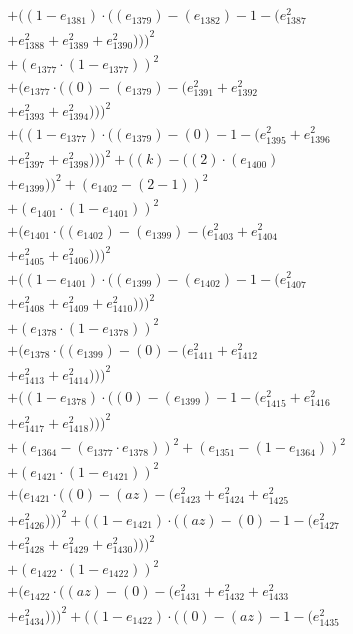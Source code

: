 \documentclass[10pt, a4paper]{article}
\begin{document}
\begin{small}
\begin{align*}
& + ((1 - e_{1381})  \cdot  ((e_{1379}) - (e_{1382}) - 1 - (e_{1387}^{2} \\
& + e_{1388}^{2} + e_{1389}^{2} + e_{1390}^{2})))^{2} \\
& + (e_{1377}  \cdot  (1 - e_{1377}))^{2} \\
& + (e_{1377}  \cdot  ((0) - (e_{1379}) - (e_{1391}^{2} + e_{1392}^{2} \\
& + e_{1393}^{2} + e_{1394}^{2})))^{2} \\
& + ((1 - e_{1377})  \cdot  ((e_{1379}) - (0) - 1 - (e_{1395}^{2} + e_{1396}^{2} \\
& + e_{1397}^{2} + e_{1398}^{2})))^{2} + ((k) - ((2)  \cdot  (e_{1400}) \\
& + e_{1399}))^{2} + (e_{1402} - (2 - 1))^{2} \\
& + (e_{1401}  \cdot  (1 - e_{1401}))^{2} \\
& + (e_{1401}  \cdot  ((e_{1402}) - (e_{1399}) - (e_{1403}^{2} + e_{1404}^{2} \\
& + e_{1405}^{2} + e_{1406}^{2})))^{2} \\
& + ((1 - e_{1401})  \cdot  ((e_{1399}) - (e_{1402}) - 1 - (e_{1407}^{2} \\
& + e_{1408}^{2} + e_{1409}^{2} + e_{1410}^{2})))^{2} \\
& + (e_{1378}  \cdot  (1 - e_{1378}))^{2} \\
& + (e_{1378}  \cdot  ((e_{1399}) - (0) - (e_{1411}^{2} + e_{1412}^{2} \\
& + e_{1413}^{2} + e_{1414}^{2})))^{2} \\
& + ((1 - e_{1378})  \cdot  ((0) - (e_{1399}) - 1 - (e_{1415}^{2} + e_{1416}^{2} \\
& + e_{1417}^{2} + e_{1418}^{2})))^{2} \\
& + (e_{1364} - (e_{1377}  \cdot  e_{1378}))^{2} + (e_{1351} - (1 - e_{1364}))^{2} \\
& + (e_{1421}  \cdot  (1 - e_{1421}))^{2} \\
& + (e_{1421}  \cdot  ((0) - (az) - (e_{1423}^{2} + e_{1424}^{2} + e_{1425}^{2} \\
& + e_{1426}^{2})))^{2} + ((1 - e_{1421})  \cdot  ((az) - (0) - 1 - (e_{1427}^{2} \\
& + e_{1428}^{2} + e_{1429}^{2} + e_{1430}^{2})))^{2} \\
& + (e_{1422}  \cdot  (1 - e_{1422}))^{2} \\
& + (e_{1422}  \cdot  ((az) - (0) - (e_{1431}^{2} + e_{1432}^{2} + e_{1433}^{2} \\
& + e_{1434}^{2})))^{2} + ((1 - e_{1422})  \cdot  ((0) - (az) - 1 - (e_{1435}^{2} \\

\end{align*}
\end{small}
\end{document}
